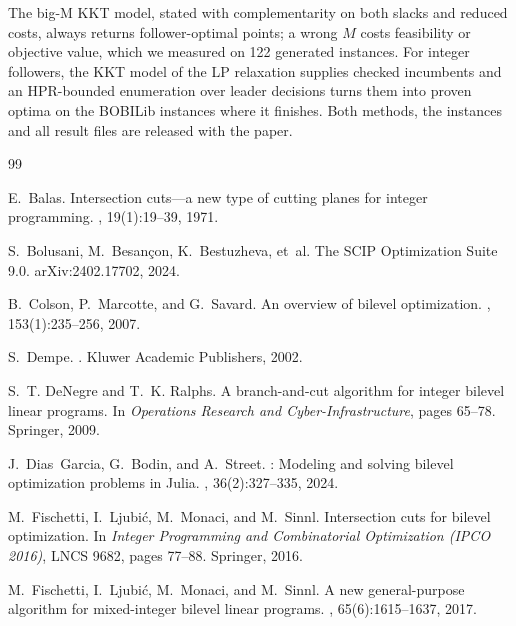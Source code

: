 \documentclass[11pt]{article}
\begin{document}
The big-M KKT model, stated with complementarity on both slacks and reduced
costs, always returns follower-optimal points; a wrong $M$ costs feasibility
or objective value, which we measured on 122 generated instances. For integer
followers, the KKT model of the LP relaxation supplies checked incumbents and
an HPR-bounded enumeration over leader decisions turns them into proven
optima on the BOBILib instances where it finishes. Both methods, the
instances and all result files are released with the paper.

\begin{thebibliography}{99}

E.~Balas.
\newblock Intersection cuts---a new type of cutting planes for integer programming.
, 19(1):19--39, 1971.

S.~Bolusani, M.~Besan{\c{c}}on, K.~Bestuzheva, et~al.
\newblock The {SCIP} Optimization Suite 9.0.
\newblock arXiv:2402.17702, 2024.

B.~Colson, P.~Marcotte, and G.~Savard.
\newblock An overview of bilevel optimization.
, 153(1):235--256, 2007.

S.~Dempe.
.
\newblock Kluwer Academic Publishers, 2002.

S.~T. DeNegre and T.~K. Ralphs.
\newblock A branch-and-cut algorithm for integer bilevel linear programs.
\newblock In {\em Operations Research and Cyber-Infrastructure}, pages 65--78. Springer, 2009.

J.~Dias~Garcia, G.~Bodin, and A.~Street.
: Modeling and solving bilevel optimization problems in {Julia}.
, 36(2):327--335, 2024.

M.~Fischetti, I.~Ljubi{\'c}, M.~Monaci, and M.~Sinnl.
\newblock Intersection cuts for bilevel optimization.
\newblock In {\em Integer Programming and Combinatorial Optimization (IPCO 2016)},
  LNCS 9682, pages 77--88. Springer, 2016.

M.~Fischetti, I.~Ljubi{\'c}, M.~Monaci, and M.~Sinnl.
\newblock A new general-purpose algorithm for mixed-integer bilevel linear programs.
, 65(6):1615--1637, 2017.


\end{thebibliography}
\end{document}
